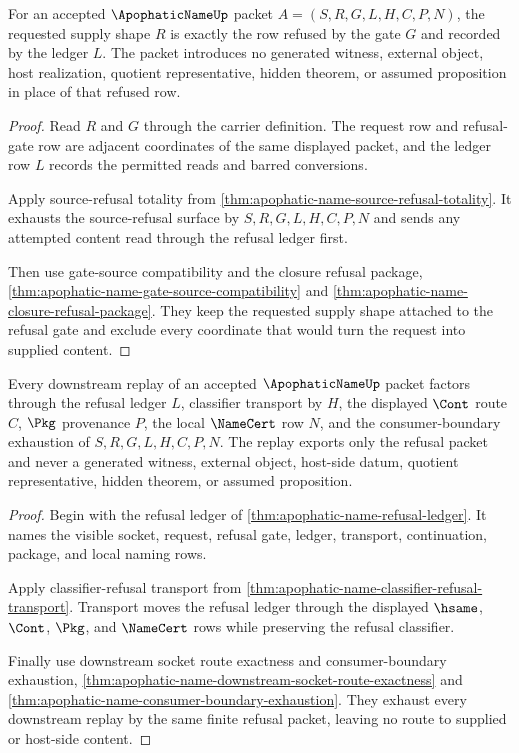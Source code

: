 \begin{theorem}
\label{thm:apophatic-name-supply-shape-refusal-exactness}
For an accepted $\ApophaticNameUp$ packet $A=(S,R,G,L,H,C,P,N)$, the requested supply shape $R$ is exactly the row refused by the gate $G$ and recorded by the ledger $L$. The packet introduces no generated witness, external object, host realization, quotient representative, hidden theorem, or assumed proposition in place of that refused row.
\end{theorem}
\begin{proof}
Read $R$ and $G$ through the carrier definition. The request row and refusal-gate row are adjacent coordinates of the same displayed packet, and the ledger row $L$ records the permitted reads and barred conversions.

Apply source-refusal totality from \autoref{thm:apophatic-name-source-refusal-totality}. It exhausts the source-refusal surface by $S,R,G,L,H,C,P,N$ and sends any attempted content read through the refusal ledger first.

Then use gate-source compatibility and the closure refusal package, \autoref{thm:apophatic-name-gate-source-compatibility} and \autoref{thm:apophatic-name-closure-refusal-package}. They keep the requested supply shape attached to the refusal gate and exclude every coordinate that would turn the request into supplied content.
\end{proof}

\begin{theorem}
\label{thm:apophatic-name-downstream-refusal-replay}
Every downstream replay of an accepted $\ApophaticNameUp$ packet factors through the refusal ledger $L$, classifier transport by $H$, the displayed $\Cont$ route $C$, $\Pkg$ provenance $P$, the local $\NameCert$ row $N$, and the consumer-boundary exhaustion of $S,R,G,L,H,C,P,N$. The replay exports only the refusal packet and never a generated witness, external object, host-side datum, quotient representative, hidden theorem, or assumed proposition.
\end{theorem}
\begin{proof}
Begin with the refusal ledger of \autoref{thm:apophatic-name-refusal-ledger}. It names the visible socket, request, refusal gate, ledger, transport, continuation, package, and local naming rows.

Apply classifier-refusal transport from \autoref{thm:apophatic-name-classifier-refusal-transport}. Transport moves the refusal ledger through the displayed $\hsame$, $\Cont$, $\Pkg$, and $\NameCert$ rows while preserving the refusal classifier.

Finally use downstream socket route exactness and consumer-boundary exhaustion, \autoref{thm:apophatic-name-downstream-socket-route-exactness} and \autoref{thm:apophatic-name-consumer-boundary-exhaustion}. They exhaust every downstream replay by the same finite refusal packet, leaving no route to supplied or host-side content.
\end{proof}

